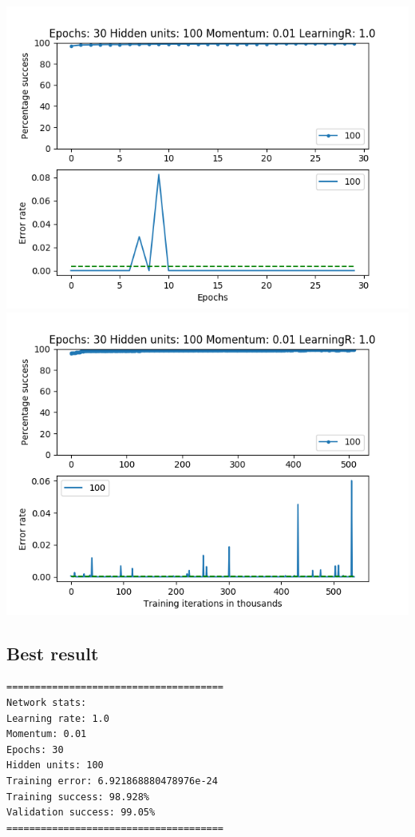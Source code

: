 \documentclass[11pt]{article}
\makeatletter
\def\maxwidth{\ifdim\Gin@nat@width>\linewidth\linewidth
    \else\Gin@nat@width\fi}
\let\Oldincludegraphics\includegraphics
\renewcommand{\includegraphics}[1]{\Oldincludegraphics[width=.8\maxwidth]{#1}}
\makeatother
\begin{document}
\includegraphics{Experiment1/E1_NN_Epoch_Momentum_0.01_30Epochs_100_LR_1.0_Hiddenunits.png}
\includegraphics{Experiment1/E1_NN_Training_Momentum_0.01_30Epochs_100_LR_1.0_Hiddenunits.png}

\hypertarget{best-result}{%
\subsection{Best result}\label{best-result}}

\begin{verbatim}
======================================
Network stats: 
Learning rate: 1.0
Momentum: 0.01
Epochs: 30
Hidden units: 100
Training error: 6.921868880478976e-24
Training success: 98.928%
Validation success: 99.05%
======================================
\end{verbatim}
\end{document}
